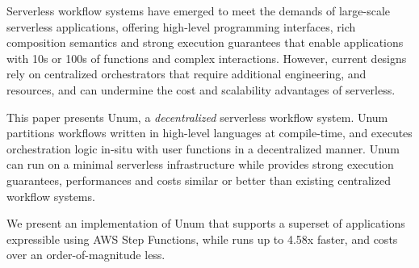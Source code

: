 Serverless workflow systems have emerged to meet the demands of large-scale
serverless applications, offering high-level programming interfaces, rich
composition semantics and strong execution guarantees that enable applications
with 10s or 100s of functions and complex interactions. However, current
designs rely on centralized orchestrators that require additional engineering,
and resources, and can undermine the cost and scalability advantages of
serverless.

This paper presents Unum, a \emph{decentralized} serverless workflow
system. Unum partitions workflows written in high-level languages at
compile-time, and executes orchestration logic in-situ with user functions in
a decentralized manner. Unum can run on a minimal serverless infrastructure
while provides strong execution guarantees, performances and costs similar or
better than existing centralized workflow systems.

We present an implementation of Unum that supports a superset of
applications expressible using AWS Step Functions, while runs up to 4.58x
faster, and costs over an order-of-magnitude less.
